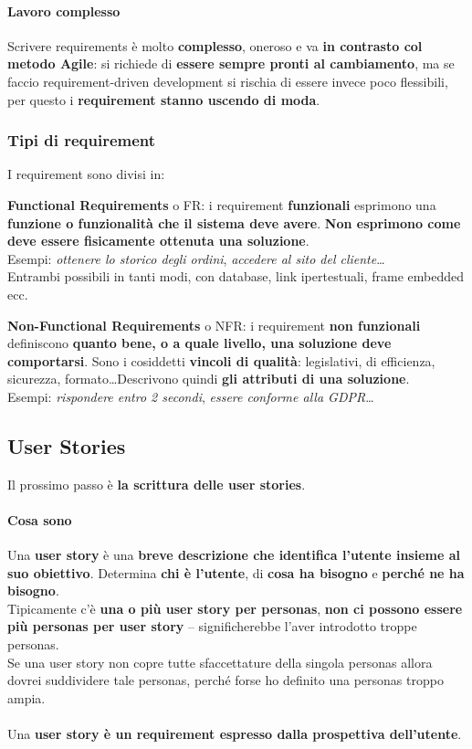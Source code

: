 \documentclass[10pt]{article}
\begin{document}
\paragraph{Lavoro complesso} Scrivere requirements è molto \textbf{complesso}, oneroso e va \textbf{in contrasto col metodo Agile}: si richiede di \textbf{essere sempre pronti al cambiamento}, ma se faccio requirement-driven development si rischia di essere invece poco flessibili, per questo i \textbf{requirement stanno uscendo di moda}.
\pagebreak
\subsubsection{Tipi di requirement} I requirement sono divisi in:
\begin{list}{}{}
\item \textbf{Functional Requirements} o FR: i requirement \textbf{funzionali} esprimono una \textbf{funzione o funzionalità che il sistema deve avere}. \textbf{Non esprimono come deve essere fisicamente ottenuta una soluzione}.\\
Esempi: \textit{ottenere lo storico degli ordini}, \textit{accedere al sito del cliente}\ldots\\
Entrambi possibili in tanti modi, con database, link ipertestuali, frame embedded ecc.
\item \textbf{Non-Functional Requirements} o NFR: i requirement \textbf{non funzionali} definiscono \textbf{quanto bene, o a quale livello, una soluzione deve comportarsi}. Sono i cosiddetti \textbf{vincoli di qualità}: legislativi, di efficienza, sicurezza, formato\ldots Descrivono quindi \textbf{gli attributi di una soluzione}.\\
Esempi: \textit{rispondere entro 2 secondi}, \textit{essere conforme alla GDPR}\ldots
\end{list}
\subsection{User Stories}
Il prossimo passo è \textbf{la scrittura delle user stories}. 
\paragraph{Cosa sono} Una \textbf{user story} è una \textbf{breve descrizione che identifica l'utente insieme al suo obiettivo}. Determina \textbf{chi è l'utente}, di \textbf{cosa ha bisogno} e \textbf{perché ne ha bisogno}.\\
Tipicamente c'è \textbf{una o più user story per personas}, \textbf{non ci possono essere più personas per user story} -- significherebbe l'aver introdotto troppe personas.\\
Se una user story non copre tutte sfaccettature della singola personas allora dovrei suddividere tale personas, perché forse ho definito una personas troppo ampia.\\\\
Una \textbf{user story è un requirement espresso dalla prospettiva dell'utente}.
\end{document}

